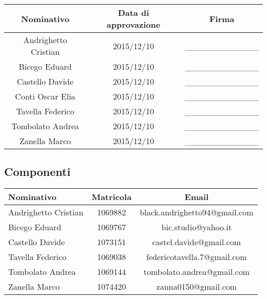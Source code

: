 \documentclass[../PianoProgetto.tex]{subfiles}
\begin{document}
\begin{appendices}
\begin{table}[h]
		\begin{tabularx}{\textwidth}{C C C}
			\toprule
			\textbf{Nominativo} & \textbf{Data di approvazione} & \textbf{Firma} \\
			\midrule
			Andrighetto Cristian & 2015/12/10 &	\_\_\_\_\_\_\_\_\_\_\_\_ \\
			Bicego Eduard & 2015/12/10 & \_\_\_\_\_\_\_\_\_\_\_\_ \\
			Castello Davide	& 2015/12/10 & \_\_\_\_\_\_\_\_\_\_\_\_ \\
			Conti Oscar Elia & 2015/12/10 &	 \_\_\_\_\_\_\_\_\_\_\_\_ \\
			Tavella Federico & 2015/12/10 &	 \_\_\_\_\_\_\_\_\_\_\_\_ \\
			Tombolato Andrea & 2015/12/10 &	 \_\_\_\_\_\_\_\_\_\_\_\_ \\
			Zanella Marco & 2015/12/10 &	\_\_\_\_\_\_\_\_\_\_\_\_ \\
			\bottomrule
		\end{tabularx}
		
	\end{table}
				
	\clearpage
	
	\subsection{Componenti}
	
		\begin{table}[h]
	
		\begin{tabularx}{\textwidth}{lc C}
			\toprule
			\textbf{Nominativo} & \textbf{Matricola} & \textbf{Email} \\
			\midrule
			Andrighetto Cristian & 1069882 & black.andrighetto94@gmail.com \\
			Bicego Eduard & 1069767 & bic.studio@yahoo.it  \\
			Castello Davide	& 1073151 &	 castel.davide@gmail.com\\
			Tavella Federico & 1069038 & federicotavella.7@gmail.com\\
			Tombolato Andrea & 1069144 & tombolato.andrea@gmail.com	 \\
			Zanella Marco & 1074420 & zanna0150@gmail.com \\
			\bottomrule
		\end{tabularx}
		

\end{table}
\end{appendices}
\end{document}
